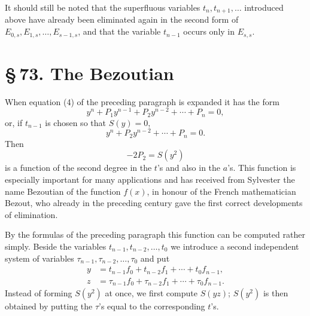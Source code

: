 \documentclass[11pt]{article}
\providecommand{\sect}[2]{\section*{\S\,#1. #2}}
\begin{document}
It should still be noted that the superfluous variables $t_n,t_{n+1},\ldots$ introduced above have already been eliminated again in the second form of $E_{0,s},E_{1,s},\ldots,E_{s-1,s}$, and that the variable $t_{n-1}$ occurs only in $E_{s,s}$.



\sect{73}{The Bezoutian}

When equation (4) of the preceding paragraph is expanded it has the form
\[
 y^n+P_1y^{n-1}+P_2y^{n-2}+\cdots+P_n=0,
\]
or, if $t_{n-1}$ is chosen so that $S(y)=0$,
\begin{equation}
 y^n+P_2y^{n-2}+\cdots+P_n=0.
\tag{1}
\end{equation}
Then
\[
 -2P_2=S(y^2)
\]
is a function of the second degree in the $t$'s and also in the $a$'s. This function is especially important for many applications and has received from Sylvester the name Bezoutian of the function $f(x)$, in honour of the French mathematician Bezout, who already in the preceding century gave the first correct developments of elimination.

By the formulas of the preceding paragraph this function can be computed rather simply. Beside the variables $t_{n-1},t_{n-2},\ldots,t_0$ we introduce a second independent system of variables $\tau_{n-1},\tau_{n-2},\ldots,\tau_0$ and put
\begin{equation}
\begin{aligned}
 y&=t_{n-1}f_0+t_{n-2}f_1+\cdots+t_0f_{n-1},\\
 z&=\tau_{n-1}f_0+\tau_{n-2}f_1+\cdots+\tau_0f_{n-1}.
\end{aligned}
\tag{2}
\end{equation}
Instead of forming $S(y^2)$ at once, we first compute $S(yz)$; $S(y^2)$ is then obtained by putting the $\tau$'s equal to the corresponding $t$'s.
\end{document}
